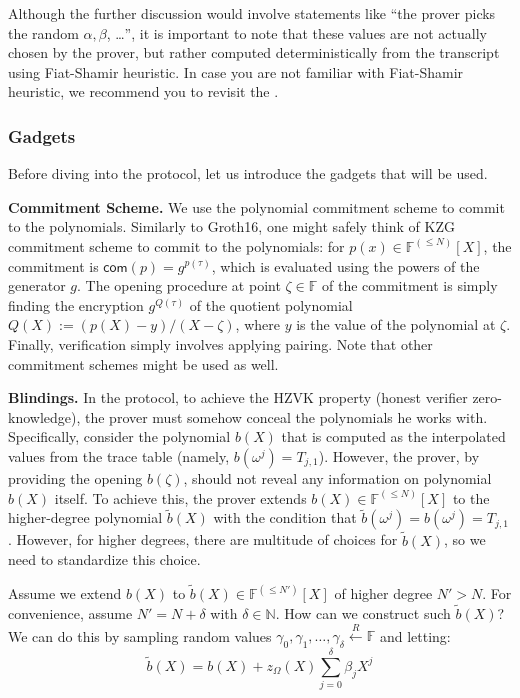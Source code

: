 \documentclass[../lecture-notes.tex]{subfiles}
\begin{document}
\begin{remark}
    Although the further discussion would involve statements like ``the prover
    picks the random $\alpha,\beta$, \ldots'', it is important to note that
    these values are not actually chosen by the prover, but rather computed
    deterministically from the transcript using Fiat-Shamir heuristic. In case 
    you are not familiar with Fiat-Shamir heuristic, we recommend you to revisit
    the .
\end{remark}

\subsubsection{Gadgets}

Before diving into the protocol, let us introduce the gadgets that will be used.

\textcolor{blue!60!black}{\textbf{Commitment Scheme.}} We use the polynomial
commitment scheme to commit to the polynomials. Similarly to Groth16, one might
safely think of KZG commitment scheme to commit to the polynomials: for $p(x)
\in \mathbb{F}^{(\leq N)}[X]$, the commitment is $\mathsf{com}(p) =
g^{p(\tau)}$, which is evaluated using the powers of the generator $g$. The
opening procedure at point $\zeta \in \mathbb{F}$ of the commitment is simply
finding the encryption $g^{Q(\tau)}$ of the quotient polynomial $Q(X) :=
(p(X)-y)/(X-\zeta)$, where $y$ is the value of the polynomial at $\zeta$.
Finally, verification simply involves applying pairing. Note that other
commitment schemes might be used as well.

\textcolor{blue!60!black}{\textbf{Blindings.}} In the protocol, to achieve 
the HZVK property (honest verifier zero-knowledge), the prover must somehow 
conceal the polynomials he works with. Specifically, consider the polynomial 
$b(X)$ that is computed as the interpolated values from the trace table (namely, 
$b(\omega^j) = T_{j,1}$). However, the prover, by providing the opening $b(\zeta)$,
should not reveal any information on polynomial $b(X)$ itself. To achieve this, the prover
extends $b(X) \in \mathbb{F}^{(\leq N)}[X]$ to the higher-degree polynomial $\widetilde{b}(X)$
with the condition that $\widetilde{b}(\omega^j) = b(\omega^j) = T_{j,1}$. However, for higher 
degrees, there are multitude of choices for $\widetilde{b}(X)$, so we need to standardize 
this choice. 

Assume we extend $b(X)$ to $\widetilde{b}(X) \in \mathbb{F}^{(\leq N')}[X]$ of
higher degree $N'>N$. For convenience, assume $N' = N + \delta$ with $\delta \in
\mathbb{N}$. How can we construct such $\widetilde{b}(X)$? We can do this by
sampling random values $\gamma_0,\gamma_1,\dots,\gamma_{\delta} \xleftarrow{R} \mathbb{F}$ and 
letting:
\begin{equation*}
    \widetilde{b}(X) = b(X) + z_{\Omega}(X)\sum_{j=0}^{\delta}\beta_jX^j
\end{equation*}
\end{document}
